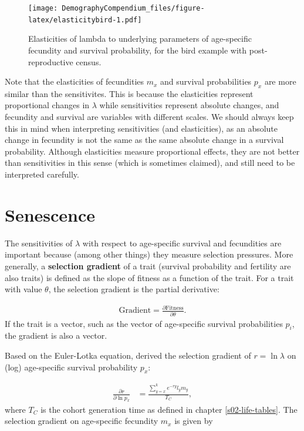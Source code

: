 \documentclass[
]{book}
\begin{document}
\begin{figure}
\centering
\texttt{[image: DemographyCompendium\_files/figure-latex/elasticitybird-1.pdf]}
\caption{\label{fig:elasticitybird}Elasticities of lambda to underlying parameters of age-specific fecundity and survival probability, for the bird example with post-reproductive census.}
\end{figure}

Note that the elasticities of fecundities \(m_x\) and survival probabilities \(p_x\) are more similar than the sensitivites. This is because the elasticities represent proportional changes in \(\lambda\) while sensitivities represent absolute changes, and fecundity and survival are variables with different scales. We should always keep this in mind when interpreting sensitivities (and elasticities), as an absolute change in fecundity is not the same as the same absolute change in a survival probability. Although elasticities measure proportional effects, they are not better than sensitivities in this sense (which is sometimes claimed), and still need to be interpreted carefully.

\hypertarget{senescence}{%
\section{Senescence}\label{senescence}}

The sensitivities of \(\lambda\) with respect to age-specific survival and fecundities are important because (among other things) they measure selection pressures. More generally, a \textbf{selection gradient} of a trait (survival probability and fertility are also traits) is defined as the slope of fitness as a function of the trait. For a trait with value \(\theta\), the selection gradient is the partial derivative:

\begin{align} 
\text{Gradient}=\frac{\partial \text{Fitness}}{\partial \theta}.
\end{align}
If the trait is a vector, such as the vector of age-specific survival probabilities \(p_i\), the gradient is also a vector.

Based on the Euler-Lotka equation, \citet{Hamilton1} derived the selection gradient of \(r=\ln\lambda\) on (log) age-specific survival probability \(p_x\):

\begin{align} 
\frac{\partial r}{\partial \ln p_x}&=\frac{\sum_{y=x}^ke^{-ry}l_ym_y}{T_C},
\end{align}
where \(T_C\) is the cohort generation time as defined in chapter \ref{s02-life-tables}. The selection gradient on age-specific fecundity \(m_x\) is given by
\end{document}
